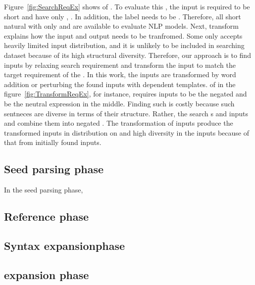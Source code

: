 \begin{figure}[t]
  
  \vspace{-10pt}
  \caption{\SearchRequirementExampleFigCaption}
  \vspace{-10pt}
\end{figure}

\begin{figure}[t]
  
  \vspace{-10pt}
  \caption{\TransformRequirementExampleFigCaption}
  \vspace{-10pt}
\end{figure}

Figure~\ref{fig:SearchReqEx} shows \lc of \SareqExOne. To evaluate
this \lc, the input is required to be short and have only \neu \adjs,
\neu \nns. In addition, the label needs to be \neu. Therefore, all
short natural \sents with only \neu \adjs and \neu \nns are available
to evaluate NLP models. Next, transform \req explains how the input
and output needs to be tranfromed. Some \lc only accepts heavily
limited input distribution, and it is unlikely to be included in
searching dataset because of its high structural diversity. Therefore,
our approach is to find inputs by relaxing search requirement and
transform the input to match the target requirement of the \lc. In
this work, the inputs are transformed by word addition or perturbing
the found inputs with \lc dependent templates. \Lc of \SareqExTwo in
the figure~\ref{fig:TransformReqEx}, for instance, requires inputs to
be the negated \pstv \sents and be the neutral expression in the
middle. Finding such \sents is costly because such sentneces are
diverse in terms of their structure. Rather, the \Model search \pstv s
and \neu inputs and combine them into negated \pstv \sents. The
transformation of inputs produce the transformed inputs in
distribution on \lc and high diversity in the inputs because of that
from initially found inputs.

\subsection{Seed parsing phase}
In the seed parsing phase, 

\subsection{Reference phase}

\subsection{Syntax expansionphase}

\subsection{\Sent expansion phase}
